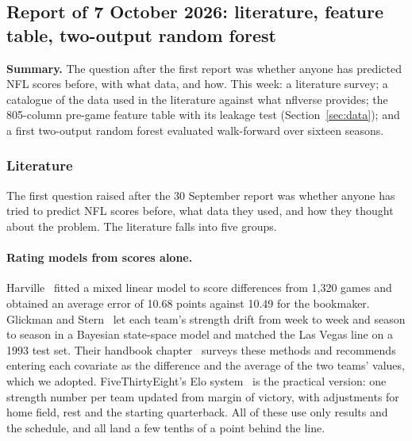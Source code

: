 \subsection{Report of 7 October 2026: literature, feature table, two-output random forest}\label{sec:w1007}

\textbf{Summary.} The question after the first report was whether anyone has predicted NFL scores before, with what data, and how. This week: a literature survey; a catalogue of the data used in the literature against what nflverse provides; the 805-column pre-game feature table with its leakage test (Section~\ref{sec:data}); and a first two-output random forest evaluated walk-forward over sixteen seasons.

\subsubsection{Literature}\label{sec:literature}


The first question raised after the 30 September report was whether anyone has tried to predict NFL scores before, what data they used, and how they thought about the problem. The literature falls into five groups.

\paragraph{Rating models from scores alone.} Harville~\cite{harville1980} fitted a mixed linear model to score differences from 1,320 games and obtained an average error of 10.68 points against 10.49 for the bookmaker. Glickman and Stern~\cite{glickmanstern1998} let each team's strength drift from week to week and season to season in a Bayesian state-space model and matched the Las Vegas line on a 1993 test set. Their handbook chapter~\cite{glickmanstern2017} surveys these methods and recommends entering each covariate as the difference and the average of the two teams' values, which we adopted. FiveThirtyEight's Elo system~\cite{fivethirtyeightelo} is the practical version: one strength number per team updated from margin of victory, with adjustments for home field, rest and the starting quarterback. All of these use only results and the schedule, and all land a few tenths of a point behind the line.

